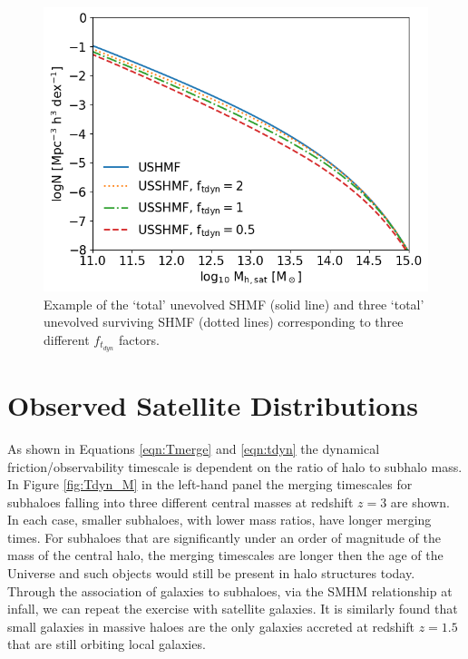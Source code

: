 \begin{figure}
    \centering
    \includegraphics[width = \linewidth]{Figures/Chapter3/SHMF.png}
    \caption{Example of the `total' unevolved SHMF (solid line) and three `total' unevolved surviving SHMF (dotted lines) corresponding to three different $f_{t_{dyn}}$ factors.}
    \label{fig:SHMF}
\end{figure}

\section{Observed Satellite Distributions}
\label{sec:ObsSatDist}
As shown in Equations \ref{eqn:Tmerge} and \ref{eqn:tdyn} the dynamical friction/observability timescale is dependent on the ratio of halo to subhalo mass. In Figure \ref{fig:Tdyn_M} in the left-hand panel the merging timescales for subhaloes falling into three different central masses at redshift $z=3$ are shown. In each case, smaller subhaloes, with lower mass ratios, have longer merging times. For subhaloes that are significantly under an order of magnitude of the mass of the central halo, the merging timescales are longer then the age of the Universe and such objects would still be present in halo structures today. Through the association of galaxies to subhaloes, via the SMHM relationship at infall, we can repeat the exercise with satellite galaxies. It is similarly found that small galaxies in massive haloes are the only galaxies accreted at redshift $z = 1.5$ that are still orbiting local galaxies.

